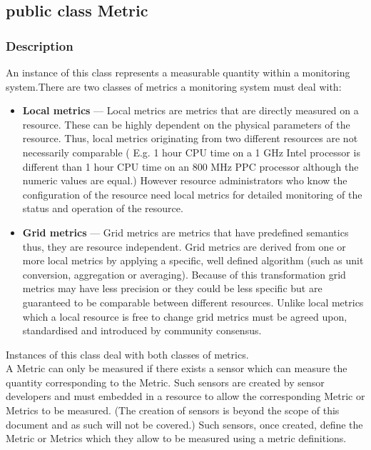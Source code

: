 \documentclass[$Date: 2003/06/26 19:29:31 $]{glabarticle}
\begin{document}
\newpage

\subsection{public class Metric}


\subsubsection{Description}

An instance of this class represents a measurable quantity within a monitoring system.There are
two classes of metrics a monitoring system must deal with:
\begin{itemize}
\item[] \textbf{Local metrics} --- Local metrics are metrics that are directly measured on a resource. These  
 can be highly dependent on the physical parameters of the resource. Thus, local metrics originating from
 two different resources are not necessarily comparable ( E.g. 1 hour CPU time on a 1 GHz Intel processor
 is different than 1 hour CPU time on an 800 MHz PPC processor although the numeric values are
 equal.) However resource administrators who know the configuration of the resource need local
 metrics for detailed monitoring of the status and operation of the resource.
\item[] \textbf{Grid metrics} ---  Grid metrics are metrics that have predefined semantics thus, they are
resource independent. Grid metrics are derived from one or more local metrics by applying a specific, 
well defined algorithm (such as unit conversion, aggregation or averaging). Because of this transformation
grid metrics may have less precision or they could be less specific but are guaranteed to be comparable
between different resources. Unlike local metrics which a local resource is free to change grid
metrics must be agreed upon, standardised and introduced by community consensus.
\end{itemize}
Instances of this class deal with both classes of metrics. \\

A Metric can only be measured if there exists a sensor which can measure the quantity corresponding to
the Metric. Such sensors are created by sensor developers and must embedded in a resource to allow
the corresponding Metric or Metrics to be measured. (The creation of sensors is beyond the scope of 
this document and as such will not be covered.) Such sensors, once created, define the Metric or Metrics 
which they allow to be measured using a metric definitions. \\
\end{document}
